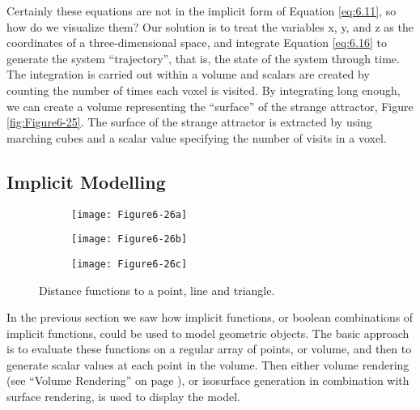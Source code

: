 Certainly these equations are not in the implicit form of Equation \ref{eq:6.11}, so how do we visualize them? Our solution is to treat the variables x, y, and z as the coordinates of a three-dimensional space, and integrate Equation \ref{eq:6.16} to generate the system ``trajectory'', that is, the state of the system through time. The integration is carried out within a volume and scalars are created by counting the number of times each voxel is visited. By integrating long enough, we can create a volume representing the ``surface'' of the strange attractor, Figure \ref{fig:Figure6-25}. The surface of the strange attractor is extracted by using marching cubes and a scalar value specifying the number of visits in a voxel.


\subsection{Implicit Modelling}
\label{subsec:implicit_modelling}

\begin{figure}[htb]
	\begin{subfigure}[h]{0.24\linewidth}
		\texttt{[image: Figure6-26a]}
		\label{fig:Figure6-26a}
	\end{subfigure}
	\hfill
	\begin{subfigure}[h]{0.24\linewidth}
		\texttt{[image: Figure6-26b]}
		\label{fig:Figure6-26b}
	\end{subfigure}
	\hfill
	\begin{subfigure}[h]{0.24\linewidth}
		\texttt{[image: Figure6-26c]}
		\label{fig:Figure6-26c}
	\end{subfigure}
	\caption{Distance functions to a point, line and triangle.}\label{fig:Figure6-26}
\end{figure}

In the previous section we saw how implicit functions, or boolean combinations of implicit functions, could be used to model geometric objects. The basic approach is to evaluate these functions on a regular array of points, or volume, and then to generate scalar values at each point in the volume. Then either volume rendering (see ``Volume Rendering'' on page \pageref{sec:volume_rendering} ), or isosurface generation in combination with surface rendering, is used to display the model.

